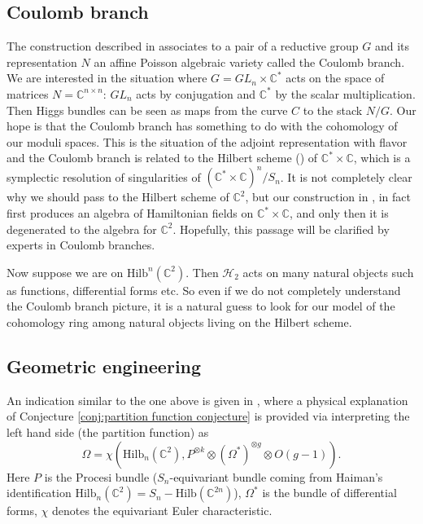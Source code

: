 \documentclass[12pt]{amsart}
\theoremstyle{definition}
\theoremstyle{remark}
\numberwithin{equation}{section}
\newcommand{\BC}{\mathbb C}
\begin{document}
	\subsection{Coulomb branch}
	The construction described in \cite{braverman2018towards} associates to a pair of a reductive group $G$ and its representation $N$ an affine Poisson algebraic variety called the Coulomb branch. We are interested in the situation where $G=GL_n\times \BC^*$ acts on the space of matrices $N=\BC^{n\times n}$: $GL_n$ acts by conjugation and $\BC^*$ by the scalar multiplication. Then Higgs bundles can be seen as maps from the curve $C$ to the stack $N/G$. Our hope is that the Coulomb branch has something to do with the cohomology of our moduli spaces. This is the situation of the adjoint representation with flavor and the Coulomb branch is related to the Hilbert scheme (\cite{braverman2021line}) of $\BC^*\times \BC$, which is a symplectic resolution of singularities of $(\BC^*\times \BC)^n / S_n$. It is not completely clear why we should pass to the Hilbert scheme of $\BC^2$, but our construction in \cite{hausel2022p}, in fact first produces an algebra of Hamiltonian fields on $\BC^*\times\BC$, and only then it is degenerated to the algebra for $\BC^2$. Hopefully, this passage will be clarified by experts in Coulomb branches.
	
	Now suppose we are on $\mathrm{Hilb}^n(\BC^2)$. Then $\mathscr{H}_2$ acts on many natural objects such as functions, differential forms etc. So even if we do not completely understand the Coulomb branch picture, it is a natural guess to look for our model of the cohomology ring among natural objects living on the Hilbert scheme.
	
	\subsection{Geometric engineering}
	An indication similar to the one above is given in \cite{chuang2015parabolic}, where a physical explanation of Conjecture \ref{conj:partition function conjecture} is provided via interpreting the left hand side (the partition function) as
	\begin{equation}\label{eq:geometric engineering}
		\Omega = \chi(\mathrm{Hilb}_n(\mathbb{C}^2), P^{\otimes k} \otimes (\Omega^{*})^{\otimes g}\otimes O(g-1)).
	\end{equation}
	Here $P$ is the Procesi bundle ($S_n$-equivariant bundle coming from Haiman's identification $\mathrm{Hilb}_n(\mathbb{C}^2)=S_n-\mathrm{Hilb}(\mathbb{C}^{2n})$), $\Omega^*$ is the bundle of differential forms, $\chi$ denotes the equivariant Euler characteristic.
	
\end{document}
